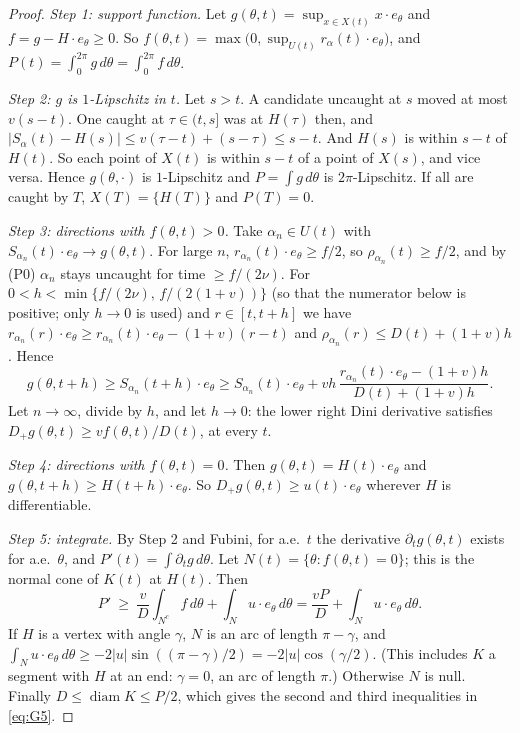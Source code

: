 \begin{proof}
\emph{Step 1: support function.} Let $g(\theta,t)=\sup_{x\in X(t)}x\cdot e_\theta$ and $f=g-H\cdot e_\theta\ge0$. So
$f(\theta,t)=\max\bigl(0,\sup_{U(t)}r_\alpha(t)\cdot e_\theta\bigr)$, and $P(t)=\int_0^{2\pi}g\,d\theta=\int_0^{2\pi}f\,d\theta$.

\emph{Step 2: $g$ is $1$-Lipschitz in $t$.} Let $s>t$. A candidate uncaught at $s$ moved at most $v(s-t)$. One caught at
$\tau\in(t,s]$ was at $H(\tau)$ then, and $|S_\alpha(t)-H(s)|\le v(\tau-t)+(s-\tau)\le s-t$. And $H(s)$ is within $s-t$ of $H(t)$. So each
point of $X(t)$ is within $s-t$ of a point of $X(s)$, and vice versa. Hence $g(\theta,\cdot)$ is $1$-Lipschitz and $P=\int g\,d\theta$ is
$2\pi$-Lipschitz. If all are caught by $T$, $X(T)=\{H(T)\}$ and $P(T)=0$.

\emph{Step 3: directions with $f(\theta,t)>0$.} Take $\alpha_n\in U(t)$ with $S_{\alpha_n}(t)\cdot e_\theta\to g(\theta,t)$. For large $n$,
$r_{\alpha_n}(t)\cdot e_\theta\ge f/2$, so $\rho_{\alpha_n}(t)\ge f/2$, and by (P0) $\alpha_n$ stays uncaught for time $\ge f/(2\nu)$. For
$0<h<\min\{f/(2\nu),\,f/(2(1+v))\}$ (so that the numerator below is positive; only $h\to0$ is used) and $r\in[t,t+h]$ we have $r_{\alpha_n}(r)\cdot e_\theta\ge r_{\alpha_n}(t)\cdot e_\theta-(1+v)(r-t)$ and
$\rho_{\alpha_n}(r)\le D(t)+(1+v)h$. Hence
\[
g(\theta,t+h)\ge S_{\alpha_n}(t+h)\cdot e_\theta\ge S_{\alpha_n}(t)\cdot e_\theta+vh\,\frac{r_{\alpha_n}(t)\cdot e_\theta-(1+v)h}{D(t)+(1+v)h} .
\]
Let $n\to\infty$, divide by $h$, and let $h\to0$: the lower right Dini derivative satisfies $D_+g(\theta,t)\ge vf(\theta,t)/D(t)$, at every $t$.

\emph{Step 4: directions with $f(\theta,t)=0$.} Then $g(\theta,t)=H(t)\cdot e_\theta$ and $g(\theta,t+h)\ge H(t+h)\cdot e_\theta$. So
$D_+g(\theta,t)\ge u(t)\cdot e_\theta$ wherever $H$ is differentiable.

\emph{Step 5: integrate.} By Step 2 and Fubini, for a.e.\ $t$ the derivative $\partial_tg(\theta,t)$ exists for a.e.\ $\theta$, and
$P'(t)=\int\partial_tg\,d\theta$. Let $N(t)=\{\theta:f(\theta,t)=0\}$; this is the normal cone of $K(t)$ at $H(t)$. Then
\[
P'\ \ge\ \frac vD\int_{N^c}f\,d\theta+\int_Nu\cdot e_\theta\,d\theta=\frac{vP}{D}+\int_Nu\cdot e_\theta\,d\theta .
\]
If $H$ is a vertex with angle $\gamma$, $N$ is an arc of length $\pi-\gamma$, and $\int_Nu\cdot e_\theta\,d\theta\ge-2|u|\sin((\pi-\gamma)/2)=
-2|u|\cos(\gamma/2)$. (This includes $K$ a segment with $H$ at an end: $\gamma=0$, an arc of length $\pi$.) Otherwise $N$ is null.
Finally $D\le\operatorname{diam}K\le P/2$, which gives the second and third inequalities in \eqref{eq:G5}.


\end{proof}

